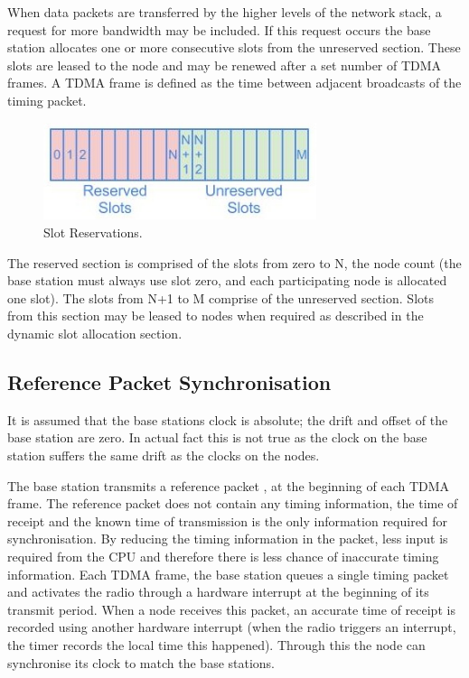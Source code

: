 \documentclass[parskip]{cs4rep}
\begin{document}
When data packets are transferred by the higher levels of the network stack, a request for more bandwidth may be included. If this request occurs the base station allocates one or more consecutive slots from the unreserved section. These slots are leased to the node and may be renewed after a set number of TDMA frames. A TDMA frame is defined as the time between adjacent broadcasts of the timing packet.

\begin{figure}
	\centering
	\includegraphics[width=80mm]{slots.jpg}
	\caption{Slot Reservations.}
\end{figure}

The reserved section is comprised of the slots from zero to N, the node count (the base station must always use slot zero, and each participating node is allocated one slot). The slots from N+1 to M comprise of the unreserved section. Slots from this section may be leased to nodes when required as described in the dynamic slot allocation section.

\subsection{Reference Packet Synchronisation}

It is assumed that the base stations clock is absolute; the drift and offset of the base station are zero. In actual fact this is not true as the clock on the base station suffers the same drift as the clocks on the nodes.

The base station transmits a reference packet \cite{PR1},\cite{PR2} at the beginning of each TDMA frame. The reference packet does not contain any timing information, the time of receipt and the known time of transmission is the only information required for synchronisation. By reducing the timing information in the packet, less input is required from the CPU and therefore there is less chance of inaccurate timing information. Each TDMA frame, the base station queues a single timing packet and activates the radio through a hardware interrupt at the beginning of its transmit period. When a node receives this packet, an accurate time of receipt is recorded using another hardware interrupt (when the radio triggers an interrupt, the timer records the local time this happened). Through this the node can synchronise its clock to match the base stations.
\end{document}
